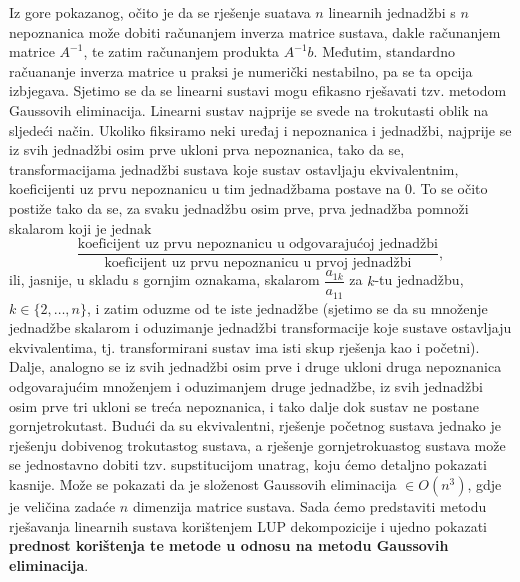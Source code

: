 \documentclass[a4paper,12pt,oneside]{article}
\begin{document}
Iz gore pokazanog, očito je da se rješenje suatava $n$ linearnih jednadžbi s $n$ nepoznanica može dobiti računanjem inverza matrice sustava, dakle računanjem matrice $A^{-1}$, te zatim računanjem produkta $A^{-1}b$. Međutim, standardno račuananje inverza matrice u praksi je numerički nestabilno, pa se ta opcija izbjegava.
\newline\newline
Sjetimo se da se linearni sustavi mogu efikasno rješavati tzv. metodom Gaussovih eliminacija. 
\newline\newline
Linearni sustav najprije se svede na trokutasti oblik na sljedeći način. Ukoliko fiksiramo neki uređaj i nepoznanica i jednadžbi, najprije se iz svih jednadžbi osim prve ukloni prva nepoznanica, tako da se, transformacijama jednadžbi sustava koje sustav ostavljaju ekvivalentnim, koeficijenti uz prvu nepoznanicu u tim jednadžbama postave na $0$. To se očito postiže tako da se, za svaku jednadžbu osim prve, prva jednadžba pomnoži skalarom koji je jednak
$$\dfrac{\text{koeficijent uz prvu nepoznanicu u odgovarajućoj jednadžbi}}{\text{koeficijent uz prvu nepoznanicu u prvoj jednadžbi}},$$
ili, jasnije, u skladu s gornjim oznakama, skalarom $\dfrac{a_{1k}}{a_{11}}$ za $k$-tu jednadžbu, $k \in \{2, \dots, n\}$, 
i zatim oduzme od te iste jednadžbe (sjetimo se da su množenje jednadžbe skalarom i oduzimanje jednadžbi transformacije koje sustave ostavljaju ekvivalentima, tj. transformirani sustav ima isti skup rješenja kao i početni). \newline
Dalje, analogno se iz svih jednadžbi osim prve i druge ukloni druga nepoznanica odgovarajućim množenjem i oduzimanjem druge jednadžbe, iz svih jednadžbi osim prve tri ukloni se treća nepoznanica, i tako dalje dok sustav ne postane gornjetrokutast. \newline
Budući da su ekvivalentni, rješenje početnog sustava jednako je rješenju dobivenog trokutastog sustava, a rješenje gornjetrokuastog sustava može se jednostavno dobiti tzv. supstitucijom unatrag, koju ćemo detaljno pokazati kasnije.
\newline\newline
Može se pokazati da je složenost Gaussovih eliminacija $\in O(n^3)$, gdje je veličina zadaće $n$ dimenzija matrice sustava.
\newline\newline
Sada ćemo predstaviti metodu rješavanja linearnih sustava korištenjem LUP dekompozicije i ujedno pokazati \textbf{prednost korištenja te metode u odnosu na metodu Gaussovih eliminacija}.
\end{document}
